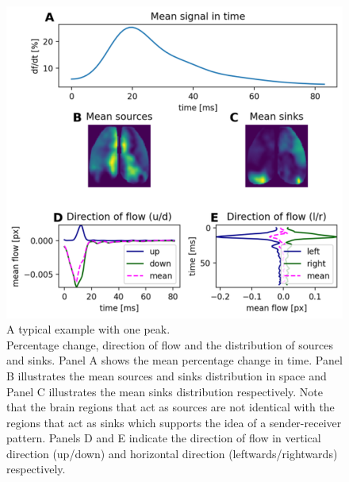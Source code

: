 \begin{figure}[!htb]
\centering
\includegraphics[width=\textwidth,height=\textheight,keepaspectratio]{Figures/percentage_change_direction_of_flow_and_sources_sinks}
\decoRule
\caption[A typical example with one peak]{A typical example with one peak.\\Percentage change, direction of flow and the distribution of sources and sinks. Panel A shows the mean percentage change in time. Panel B illustrates the mean sources and sinks distribution in space and Panel C illustrates the mean sinks distribution respectively. Note that the brain regions that act as sources are not identical with the regions that act as sinks which supports the idea of a sender-receiver pattern. Panels D and E indicate the direction of flow in vertical direction (up/down) and horizontal direction (leftwards/rightwards) respectively.}
\label{fig:percentage_change_direction_of_flow_and_sources_sinks}
\end{figure}


